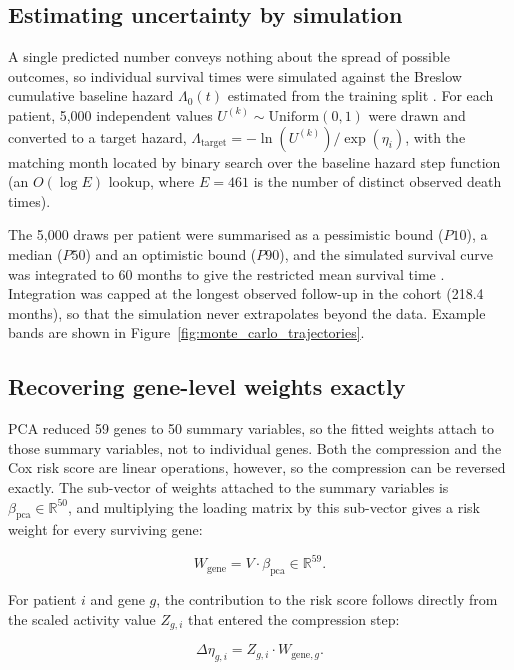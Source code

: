 \documentclass[10pt,a4paper]{article}
\begin{document}
\subsection{Estimating uncertainty by simulation}

A single predicted number conveys nothing about the spread of possible outcomes, so
individual survival times were simulated against the Breslow cumulative baseline
hazard $\Lambda_0(t)$ estimated from the training split
\citep{breslow1972discussion}. For each patient, 5,000 independent values
$U^{(k)} \sim \mathrm{Uniform}(0, 1)$ were drawn and converted to a target hazard,
$\Lambda_{\text{target}} = -\ln(U^{(k)}) / \exp(\eta_i)$, with the matching month
located by binary search over the baseline hazard step function (an $O(\log E)$
lookup, where $E = 461$ is the number of distinct observed death times).

The 5,000 draws per patient were summarised as a pessimistic bound ($P10$), a
median ($P50$) and an optimistic bound ($P90$), and the simulated survival curve
was integrated to 60 months to give the restricted mean survival time
\citep{royston2013restricted}. Integration was capped at the longest observed
follow-up in the cohort (218.4 months), so that the simulation never extrapolates
beyond the data. Example bands are shown in
Figure~\ref{fig:monte_carlo_trajectories}.

\subsection{Recovering gene-level weights exactly}

PCA reduced 59 genes to 50 summary variables, so the fitted weights attach to those
summary variables, not to individual genes. Both the compression and the Cox risk
score are linear operations, however, so the compression can be reversed exactly.
The sub-vector of weights attached to the summary variables is
$\beta_{\text{pca}} \in \mathbb{R}^{50}$, and multiplying the loading matrix by
this sub-vector gives a risk weight for every surviving gene:

\begin{equation}
W_{\text{gene}} = V \cdot \beta_{\text{pca}} \in \mathbb{R}^{59}.
\end{equation}

For patient $i$ and gene $g$, the contribution to the risk score follows directly
from the scaled activity value $Z_{g,i}$ that entered the compression step:

\begin{equation}
\Delta \eta_{g,i} = Z_{g,i} \cdot W_{\text{gene},g}.
\end{equation}
\end{document}

